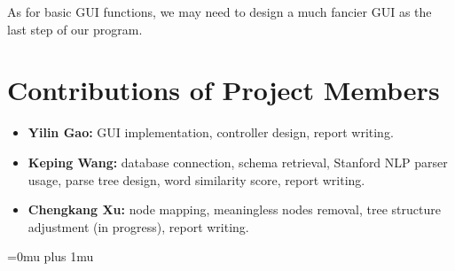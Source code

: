 \documentclass[twocolumn]{article}
\begin{document}
As for basic GUI functions, we may need to design a much fancier GUI as the last step of our program.

\section{Contributions of Project Members}

\begin{itemize}
\item {\bf Yilin Gao:} GUI implementation, controller design, report writing.
\item {\bf Keping Wang:} database connection, schema retrieval, Stanford NLP parser usage, parse tree design, word similarity score, report writing.
\item {\bf Chengkang Xu:} node mapping, meaningless nodes removal, tree structure adjustment (in progress), report writing.
\end{itemize}


\Urlmuskip=0mu plus 1mu\relax


\end{document}
